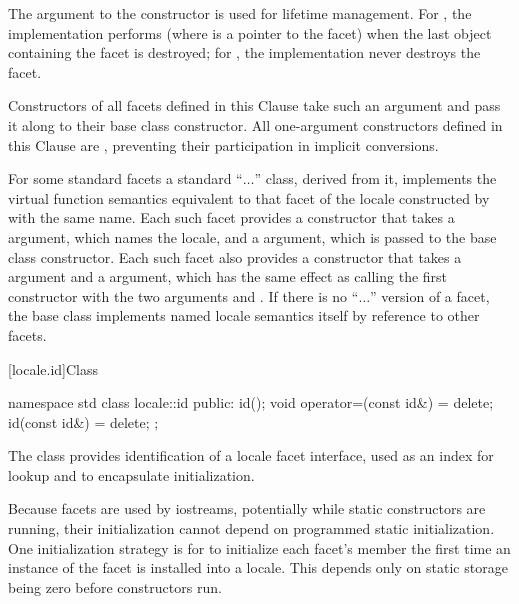 \pnum
The  argument to the constructor is used for lifetime management.
For ,
the implementation performs 
(where  is a point\-er to the facet)
when the last  object containing the facet is destroyed;
for , the implementation never destroys the facet.

\pnum
Constructors of all facets defined in this Clause
take such an argument and pass it along to
their  base class constructor.
All one-argument constructors defined in this Clause are ,
preventing their participation in implicit conversions.

\pnum
For some standard facets a standard ``$\ldots$'' class,
derived from it, implements the virtual function semantics
equivalent to that facet of the locale
constructed by  with the same name.
Each such facet provides a constructor that takes
a  argument, which names the locale, and
a  argument, which is passed to the base class constructor.
Each such facet also provides a constructor that takes
a  argument  and
a  argument,
which has the same effect as calling the first constructor
with the two arguments  and .
If there is no ``$\ldots$'' version of a facet,
the base class implements named locale semantics itself
by reference to other facets.

[locale.id]{Class }

%
\begin{codeblock}
namespace std {
  class locale::id {
  public:
    id();
    void operator=(const id&) = delete;
    id(const id&) = delete;
  };
}
\end{codeblock}

\pnum
The class  provides
identification of a locale facet interface,
used as an index for lookup and to encapsulate initialization.

\pnum
\begin{note}
Because facets are used by iostreams,
potentially while static constructors are running,
their initialization cannot depend on programmed static initialization.
One initialization strategy is for 
to initialize each facet's  member
the first time an instance of the facet is installed into a locale.
This depends only on static storage being zero
before constructors run.
\end{note}

